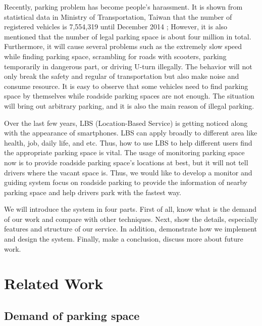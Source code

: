 \documentclass[runningheads,a4paper]{llncs}
\begin{document}
Recently, parking problem has become people's harassment.
It is shown from statistical data in Ministry of
Transportation, Taiwan that the number of registered vehicles is
7,554,319 until December 2014 \cite{motc}; However, it is also mentioned that
the number of legal parking space is about four million in total.
Furthermore, it will cause several problems such as the extremely slow
speed while finding parking space, scrambling for roads with scooters,
parking temporarily in dangerous part, or driving U-turn illegally. The
behavior will not only break the safety and regular of transportation
but also make noise and consume resource.
It is easy to observe that some vehicles need to find parking space by
themselves while roadside parking spaces are not enough. The situation
will bring out arbitrary parking, and it is also the main reason of
illegal parking.

Over the last few years, LBS (Location-Based Service) \cite{LBS} is getting noticed along with
the appearance of smartphones. LBS can apply broadly to different area
like health, job, daily life, and etc. Thus, how to use LBS to help
different users find the appropriate parking space is vital. The usage
of monitoring parking space now is to provide roadside parking space's
locations at best, but it will not tell drivers where the vacant space
is. Thus, we would like to develop a monitor and guiding system focus on
roadside parking to provide the information of nearby parking space and
help drivers park with the fastest way.

We will introduce the system in four parts. First of all, know what is
the demand of our work and compare with other techniques. Next, show the
details, especially features and structure of our service. In addition,
demonstrate how we implement and design the system. Finally, make a
conclusion, discuss more about future work.


\section{Related Work}\label{sec:relatedWork}

%
\subsection{Demand of parking space}
%
\end{document}
